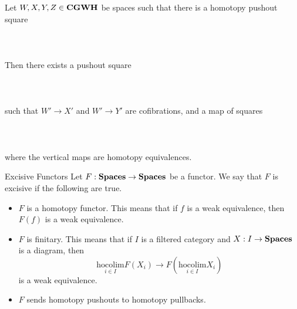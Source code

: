 \documentclass[a4paper]{article}
\begin{document}
\begin{prp}{}{} Let $W,X,Y,Z\in\bold{CGWH}$ be spaces such that there is a homotopy pushout square \\~\\
\\~\\
Then there exists a pushout square \\~\\
\\~\\
such that $W'\to X'$ and $W'\to Y'$ are cofibrations, and a map of squares \\~\\
\\~\\
where the vertical maps are homotopy equivalences. 
\end{prp}

\begin{defn}{Excisive Functors}{} Let $F:\bold{Spaces}\to\bold{Spaces}$ be a functor. We say that $F$ is excisive if the following are true. 
\begin{itemize}
\item $F$ is a homotopy functor. This means that if $f$ is a weak equivalence, then $F(f)$ is a weak equivalence. 
\item $F$ is finitary. This means that if $I$ is a filtered category and $X:I\to\bold{Spaces}$ is a diagram, then $$\underset{i\in I}{\text{hocolim}}F(X_i)\to F\left(\underset{i\in I}{\text{hocolim}}X_i\right)$$ is a weak equivalence. 
\item $F$ sends homotopy pushouts to homotopy pullbacks. 
\end{itemize}
\end{defn}
\end{document}
